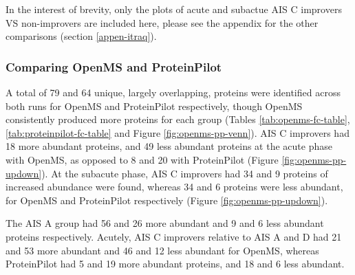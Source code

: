 \documentclass[
]{article}
\begin{document}
In the interest of brevity, only the plots of acute and subactue AIS C improvers VS non-improvers are included here, please see the appendix for the other comparisons (section \ref{appen-itraq}).

\hypertarget{comparing-openms-and-proteinpilot}{%
\subsubsection{Comparing OpenMS and ProteinPilot}\label{comparing-openms-and-proteinpilot}}

A total of 79 and 64 unique, largely overlapping, proteins were identified across both runs for OpenMS and ProteinPilot respectively, though OpenMS consistently produced more proteins for each group (Tables \ref{tab:openms-fc-table}, \ref{tab:proteinpilot-fc-table} and Figure \ref{fig:openms-pp-venn}).
AIS C improvers had 18 more abundant proteins, and 49 less abundant proteins at the acute phase with OpenMS, as opposed to 8 and 20 with ProteinPilot (Figure \ref{fig:openms-pp-updown}).
At the subacute phase, AIS C improvers had 34 and 9 proteins of increased abundance were found, whereas 34 and 6 proteins were less abundant, for OpenMS and ProteinPilot respectively (Figure \ref{fig:openms-pp-updown}).

The AIS A group had 56 and 26 more abundant and 9 and 6 less abundant proteins respectively.
Acutely, AIS C improvers relative to AIS A and D had 21 and 53 more abundant and 46 and 12 less abundant for OpenMS, whereas ProteinPilot had 5 and 19 more abundant proteins, and 18 and 6 less abundant.

\clearpage
\end{document}
